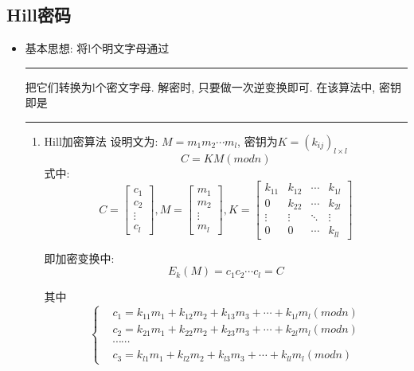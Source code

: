 \documentclass[UTF8]{ctexart}
\newcommand\hl{\bgroup\markoverwith
  {\textcolor{yellow}{\rule[-.5ex]{2pt}{2.5ex}}}\ULon}
\begin{document}
    \subsection{Hill密码}
    \begin{itemize}
        \item 基本思想: 将l个明文字母通过\hl{线性变换}把它们转换为l个密文字母. 解密时, 只要做一次逆变换即可. 在该算法中, 密钥即是\hl{变换举证}
        \begin{enumerate}
            \renewcommand\labelenumi{(\theenumi)}
            \item Hill加密算法
            设明文为: $M=m_1m_2\cdots m_l$, 密钥为$K=(k_{ij})_{l\times l}$
            $$C=KM(mod n)$$
            式中:
            \begin{equation}
                C=\left[ \begin{array}{c}{c_{1}} \\ {c_{2}} \\ {\vdots} \\ {c_{l}}\end{array}\right],
                M=\left[ \begin{array}{c}{m_{1}} \\ {m_{2}} \\ {\vdots} \\ {m_{l}}\end{array}\right],
                K=\left[ \begin{array}{cccc}{k_{11}} & {k_{12}} & {\cdots} & {k_{1 l}} \\ {0} & {k_{22}} & {\cdots} & {k_{2 l}} \\ {\vdots} & {\vdots} & {\ddots} & {\vdots} \\ {0} & {0} & {\cdots} & {k_{l l}}\end{array}\right]
            \end{equation}

            即加密变换中:
            $$E_k(M) = c_1c_2\cdots c_l = C$$

            其中
            \begin{equation}
                \left\{
                    \begin{aligned} &c_1=k_{11}m_1+k_{12}m_2+k_{13}m_3+\cdots +k_{1l}m_l (mod n)\\
                                    &c_2=k_{21}m_1+k_{22}m_2+k_{23}m_3+\cdots +k_{2l}m_l (mod n)\\
                                    &\cdots \cdots \\
                                    &c_3=k_{l1}m_1+k_{l2}m_2+k_{l3}m_3+\cdots +k_{ll}m_l (mod n)
                    \end{aligned}\right.
            \end{equation}


\end{enumerate}
\end{itemize}
\end{document}

